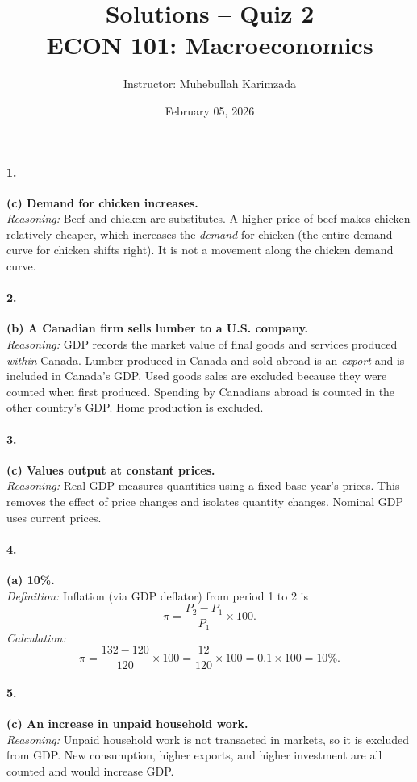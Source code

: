 \documentclass[11pt]{article}
\title{\textbf{Solutions -- Quiz 2} \vspace{ 0.4cm }\\ECON 101: Macroeconomics }
\author{Instructor: Muhebullah Karimzada}
\date{February 05,  2026}
\begin{document}
\maketitle




\paragraph{1.} \textbf{(c) Demand for chicken increases.}\\
\emph{Reasoning:} Beef and chicken are substitutes. A higher price of beef makes chicken relatively cheaper, which increases the \emph{demand} for chicken (the entire demand curve for chicken shifts right). It is not a movement along the chicken demand curve.

\paragraph{2.} \textbf{(b) A Canadian firm sells lumber to a U.S. company.}\\
\emph{Reasoning:} GDP records the market value of final goods and services produced \emph{within} Canada. Lumber produced in Canada and sold abroad is an \emph{export} and is included in Canada’s GDP. Used goods sales are excluded because they were counted when first produced. Spending by Canadians abroad is counted in the other country’s GDP. Home production is excluded.

\paragraph{3.} \textbf{(c) Values output at constant prices.}\\
\emph{Reasoning:} Real GDP measures quantities using a fixed base year’s prices. This removes the effect of price changes and isolates quantity changes. Nominal GDP uses current prices.

\paragraph{4.} \textbf{(a) 10\%.}\\
\emph{Definition:} Inflation (via GDP deflator) from period 1 to 2 is
\[
\pi=\frac{P_2-P_1}{P_1}\times 100.
\]
\emph{Calculation:}
\[
\pi=\frac{132-120}{120}\times 100=\frac{12}{120}\times 100=0.1\times 100=10\%.
\]

\paragraph{5.} \textbf{(c) An increase in unpaid household work.}\\
\emph{Reasoning:} Unpaid household work is not transacted in markets, so it is excluded from GDP. New consumption, higher exports, and higher investment are all counted and would increase GDP.
\end{document}
